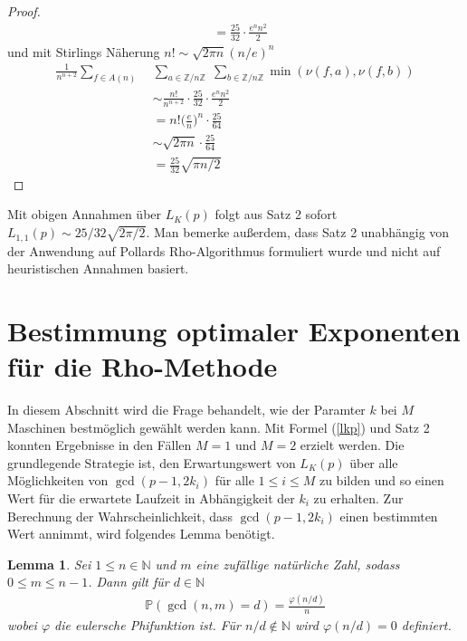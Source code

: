\documentclass[a4paper, 10pt, ngerman]{article}
\newcommand{\N}{\mathbb{N}}
\newcommand{\Z}{\mathbb{Z}}
\newtheorem{lemma}{Lemma}
\begin{document}
\begin{proof}
\begin{align*}
         & = \frac {25} {32} \cdot \frac {e^n n^2} {2}
    \end{align*}
    und mit Stirlings Näherung $n! \sim \sqrt{2\pi n} (n/e)^n$
    \begin{align*}
        \frac 1 {n^{n + 2}} \sum_{f \in A(n)} \;
         & \sum_{a \in \Z/n\Z} \; \sum_{b \in \Z/n\Z} \min(\nu(f, a), \nu(f, b))    \\
         & \sim \frac {n!}{n^{n + 2}} \cdot \frac {25} {32} \cdot \frac {e^n n^2} 2 \\
         & = n! \bigg (\frac {e} {n} \bigg )^n \cdot \frac {25} {64}                \\
         & \sim \sqrt {2 \pi n} \cdot \frac {25}{64}                                \\
         & = \frac {25} {32} \sqrt{\pi n/2}
    \end{align*}
\end{proof}

\noindent Mit obigen Annahmen über $L_K(p)$ folgt aus Satz 2 sofort $L_{1, 1}(p) \sim 25/32 \sqrt{2 \pi / 2}$. Man bemerke außerdem, dass Satz 2 unabhängig von der Anwendung auf Pollards Rho-Algorithmus formuliert wurde und nicht auf heuristischen Annahmen basiert.

\section{Bestimmung optimaler Exponenten für die Rho-Methode}\label{sec:optk}

In diesem Abschnitt wird die Frage behandelt, wie der Paramter $k$ bei $M$ Maschinen bestmöglich gewählt werden kann. Mit Formel (\ref{lkp}) und Satz 2 konnten Ergebnisse in den Fällen $M = 1$ und $M = 2$ erzielt werden. Die grundlegende Strategie ist, den Erwartungswert von $L_K(p)$ über alle Möglichkeiten von $\gcd(p - 1, 2k_i)$ für alle $1 \le i \le M$ zu bilden und so einen Wert für die erwartete Laufzeit in Abhängigkeit der $k_i$ zu erhalten. Zur Berechnung der Wahrscheinlichkeit, dass $\gcd(p - 1, 2k_i)$ einen bestimmten Wert annimmt, wird folgendes Lemma benötigt.

\begin{lemma}
    Sei $1 \le n \in \N$ und $m$ eine zufällige natürliche Zahl, sodass $0 \le m \le n - 1$. Dann gilt für $d \in \N$
    \begin{align*}
        \mathbb{P}(\gcd(n, m) = d) = \frac {\varphi(n / d)} n
    \end{align*}
    wobei $\varphi$ die eulersche Phifunktion ist. Für $n/d \notin \N$ wird $\varphi(n/d) = 0$ definiert.
\end{lemma}
\end{document}
